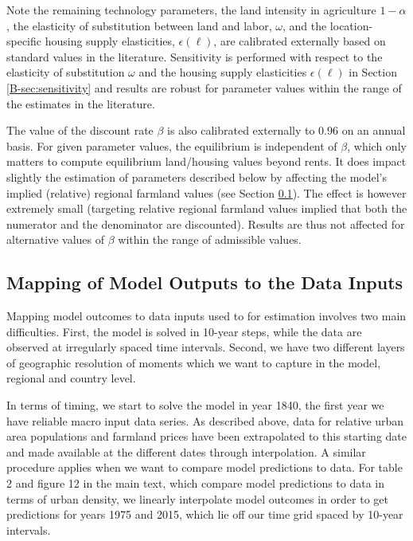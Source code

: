 \documentclass[11pt]{report}
\begin{document}

Note the remaining technology parameters, the land intensity in agriculture $1-\alpha$, the elasticity of substitution between land and labor, $\omega$, and the location-specific housing supply elasticities, $\epsilon(\ell)$, are calibrated externally based on standard values in the literature. Sensitivity is performed with respect to the elasticity of substitution $\omega$ and the housing supply elasticities $\epsilon(\ell)$ in Section \ref{B-sec:sensitivity} and results are robust for parameter values within the range of the estimates in the literature. 

The value of the discount rate $\beta$ is also calibrated externally to $0.96$ on an annual basis. For given parameter values, the equilibrium is independent of $\beta$, which only matters to compute equilibrium land/housing values beyond rents. It does impact slightly the estimation of parameters described below by affecting the model's implied (relative) regional farmland values (see Section \ref{B-sec:map-model-to-data}). The effect is however extremely small (targeting relative regional farmland values implied that both the numerator and the denominator are discounted). Results are thus not affected for alternative values of $\beta$ within the range of admissible values.


\subsection{Mapping of Model Outputs to the Data Inputs}\label{B-sec:map-model-to-data}

Mapping model outcomes to data inputs used to for estimation involves two main difficulties. First, the model is solved in 10-year steps, while the data are observed at irregularly spaced time intervals. Second, we have two different layers of geographic resolution of moments which we want to capture in the model, regional and country level. 

In terms of timing, we start to solve the model in year 1840, the first year we have reliable macro input data series. As described above, data for relative urban area populations and farmland prices have been extrapolated to this starting date and made available at the different dates through interpolation. A similar procedure applies when we want to compare model predictions to data. For table 2 and figure 12 in the main text, which compare model predictions to data in terms of urban density, we linearly interpolate model outcomes in order to get predictions for years 1975 and 2015, which lie off our time grid spaced by 10-year intervals.
\end{document}

